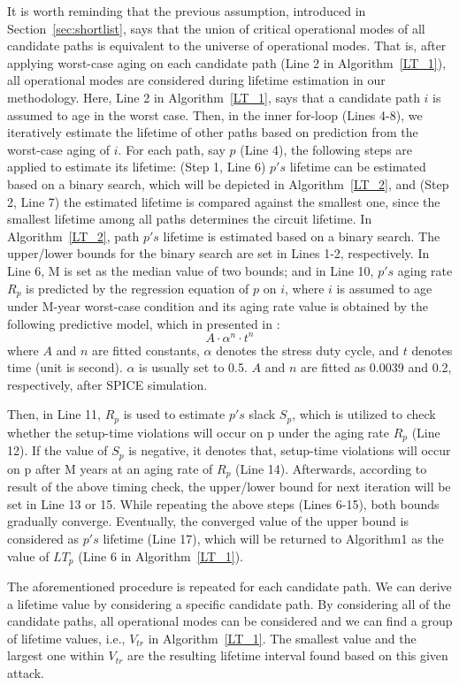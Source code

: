 It is worth reminding that the previous assumption, introduced in Section~\ref{sec:shortlist}, says that the union of critical operational modes of all candidate paths is equivalent to the universe of operational modes. That is, after applying worst-case aging on each candidate path (Line 2 in Algorithm~\ref{LT_1}), all operational modes are considered during lifetime estimation in our methodology. Here, Line 2 in Algorithm~\ref{LT_1}, says that a candidate path $i$ is assumed to age in the worst case. Then, in the inner for-loop (Lines 4-8), we iteratively estimate the lifetime of other paths based on prediction from the worst-case aging of $i$. For each path, say $p$ (Line 4), the following steps are applied to estimate its lifetime: (Step 1, Line 6) $p's$ lifetime can be estimated based on a binary search, which will be depicted in Algorithm~\ref{LT_2}, and (Step 2, Line 7) the estimated lifetime is compared against the smallest one, since the smallest lifetime among all paths determines the circuit lifetime.
In Algorithm~\ref{LT_2}, path $p's$ lifetime is estimated based on a binary search. The upper/lower bounds for the binary search are set in Lines 1-2, respectively. In Line 6, M is set as the median value of two bounds; and in Line 10, $p's$ aging rate $R_{p}$ is predicted by the regression equation of $p$ on $i$, where $i$ is assumed to age under M-year worst-case condition and its aging rate value is obtained by the following predictive model, which in presented in \cite{wang2007efficient}:
\begin{equation}
	A \cdot \alpha^n \cdot t^n 
\end{equation}
where $A$ and $n$ are fitted constants, $\alpha$ denotes the stress duty cycle, and $t$ denotes time (unit is second). $\alpha$ is usually set to 0.5. $A$ and $n$ are fitted as 0.0039 and 0.2, respectively, after SPICE simulation.

Then, in Line 11, $R_{p}$ is used to estimate $p's$ slack $S_{p}$, which is utilized to check whether the setup-time violations will occur on p under the aging rate $R_{p}$ (Line 12). If the value of $S_{p}$ is negative, it denotes that, setup-time violations will occur on p after M years at an aging rate of $R_{p}$ (Line 14). Afterwards, according to result of the above timing check, the upper/lower bound for next iteration will be set in Line 13 or 15. While repeating the above steps (Lines 6-15), both bounds gradually converge. Eventually, the converged value of the upper bound is considered as $p's$ lifetime (Line 17), which will be returned to Algorithm1 as the value of $LT_{p}$ (Line 6 in Algorithm~\ref{LT_1}).

The aforementioned procedure is repeated for each candidate path. We can derive a lifetime value by considering a specific candidate path. By considering all of the candidate
paths, all operational modes can be considered and we can find a group of lifetime values, i.e., $V_{tr}$ in Algorithm~\ref{LT_1}. The smallest value and the largest one within $V_{tr}$ are the resulting lifetime interval found based on this given attack.